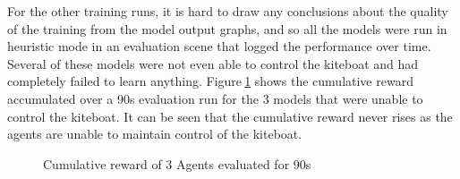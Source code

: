 For the other training runs, it is hard to draw any conclusions about the quality of the training from the model output graphs, and so all the models were run in heuristic mode in an evaluation scene that logged the performance over time. Several of these models were not even able to control the kiteboat and had completely failed to learn anything. Figure$~$\ref{bad_runs} shows the cumulative reward accumulated over a 90s evaluation run for the 3 models that were unable to control the kiteboat. It can be seen that the cumulative reward never rises as the agents are unable to maintain control of the kiteboat.

\begin{figure}[!htb]
    \centering
    \caption{Cumulative reward of 3 Agents evaluated for 90s}\label{bad_runs}
\end{figure}

